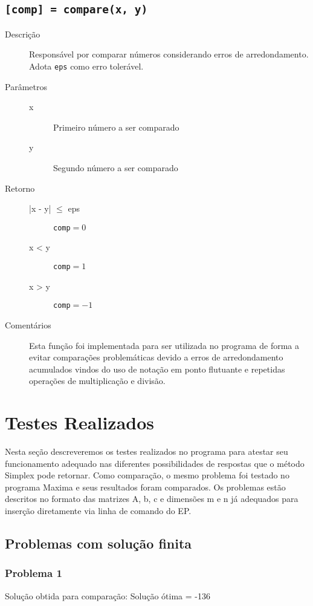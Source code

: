 \documentclass[brazil,times]{abnt}
\begin{document}
\subsection*{\texttt{[comp] = compare(x, y)}}
\begin{description}
	\item[Descrição] Responsável por comparar números considerando erros de arredondamento. Adota \texttt{eps} como erro tolerável.
	\item[Parâmetros] 
		\begin{description}
		 \item[x] Primeiro número a ser comparado
		 \item[y] Segundo número a ser comparado
		\end{description}
	\item[Retorno]
		\begin{description}
		 \item[|x - y| $\leq$ eps] \texttt{comp}$ = 0$
		 \item[x < y] \texttt{comp}$ = 1$
		 \item[x > y] \texttt{comp}$ = -1$
		\end{description}
	\item[Comentários] Esta função foi implementada para ser utilizada no programa de forma a evitar comparações problemáticas devido a erros de arredondamento acumulados vindos do uso de notação em ponto flutuante e repetidas operações de multiplicação e divisão.
\end{description}

\section*{Testes Realizados}
Nesta seção descreveremos os testes realizados no programa para atestar seu funcionamento adequado nas diferentes possibilidades de respostas que o método Simplex pode retornar. Como comparação, o mesmo problema foi testado no programa Maxima \cite{maxima} e seus resultados foram comparados. Os problemas estão descritos no formato das matrizes A, b, c e dimensões m e n já adequados para inserção diretamente via linha de comando do EP.

\subsection*{Problemas com solução finita}
\subsubsection*{Problema 1}
Solução obtida para comparação: Solução ótima = -136
\end{document}
